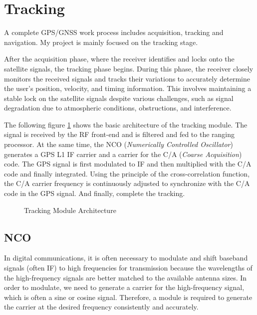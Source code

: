 \section{Tracking}
A complete GPS/GNSS work process includes acquisition, tracking and navigation. My project is mainly focused on the tracking stage.

After the acquisition phase, where the receiver identifies and locks onto the satellite signals, the tracking phase begins. During this phase, the receiver closely monitors the received signals and tracks their variations to accurately determine the user's position, velocity, and timing information. This involves maintaining a stable lock on the satellite signals despite various challenges, such as signal degradation due to atmospheric conditions, obstructions, and interference.

The following figure \ref{fig:tracking_digram} shows the basic architecture of the tracking module. The signal is received by the RF front-end and is filtered and fed to the ranging processor. At the same time, the NCO (\textit{Numerically Controlled Oscillator}) generates a GPS L1 IF carrier and a carrier for the C/A (\textit{Coarse Acquisition}) code. The GPS signal is first modulated to IF and then multiplied with the C/A code and finally integrated. Using the principle of the cross-correlation function, the C/A carrier frequency is continuously adjusted to synchronize with the C/A code in the GPS signal. And finally, complete the tracking\cite{RN151}.
\begin{figure}[!h]
    \centering
    
    \caption{Tracking Module Architecture}
    \label{fig:tracking_digram}
\end{figure}

\subsection{NCO}
In digital communications, it is often necessary to modulate and shift baseband signals (often IF) to high frequencies for transmission because the wavelengths of the high-frequency signals are better matched to the available antenna sizes. In order to modulate, we need to generate a carrier for the high-frequency signal, which is often a sine or cosine signal. Therefore, a module is required to generate the carrier at the desired frequency consistently and accurately.


